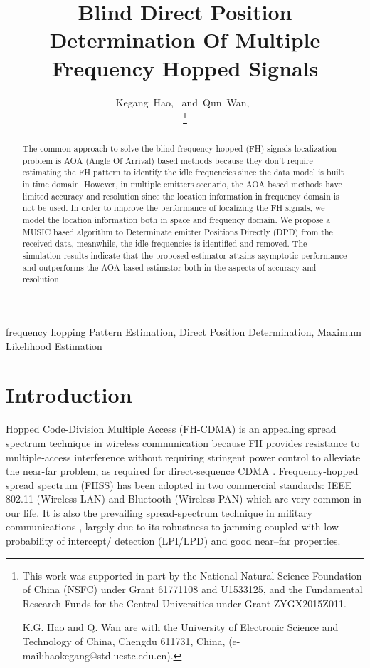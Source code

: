\documentclass[journal,10pt]{IEEEtran}
\begin{document}
\title{Blind Direct Position Determination Of Multiple Frequency Hopped Signals}

\author{Kegang~Hao,~
        and~Qun~Wan,~
        
\thanks{This work was supported in part by the National Natural Science Foundation of China (NSFC) under Grant 61771108 and U1533125, and the Fundamental Research Funds for the Central Universities under Grant ZYGX2015Z011.

    K.G. Hao and Q. Wan are with the University of Electronic Science and Technology of China, Chengdu 611731, China, (e-mail:haokegang@std.uestc.edu.cn).}
}


\maketitle

\begin{abstract}
The common approach to solve the blind frequency hopped (FH) signals localization problem is AOA (Angle Of Arrival) based methods because
they don't require estimating the FH pattern to identify the idle frequencies since the data model is built in time domain.
However, in multiple emitters scenario, the AOA based methods have limited accuracy and resolution since the location information in frequency domain is not be used.
In order to improve the performance of localizing the FH signals, we model the location information both in space and frequency domain.
We propose a MUSIC based algorithm to Determinate emitter Positions Directly (DPD) from the received data, meanwhile, the idle frequencies is identified and removed. 
The simulation results indicate that the proposed estimator attains asymptotic performance and outperforms the AOA based estimator both in the aspects of accuracy and resolution. 
\end{abstract}

\begin{IEEEkeywords}
frequency hopping Pattern Estimation, Direct Position Determination, Maximum Likelihood Estimation
\end{IEEEkeywords}


\IEEEpeerreviewmaketitle


\section{Introduction}
\label{sec:intro}

 Hopped Code-Division Multiple Access (FH-CDMA) is an appealing spread spectrum technique in wireless communication 
because FH provides resistance to multiple-access interference 
without requiring stringent power control to alleviate the near-far problem, as required for direct-sequence CDMA \cite{torrieri2000mobile}.
Frequency-hopped spread spectrum (FHSS) has been adopted in two commercial standards: IEEE 802.11 (Wireless LAN) and Bluetooth
(Wireless PAN) which are very common in our life. It is also the prevailing spread-spectrum technique in military communications \cite{torrieri1997future}, 
largely due to its robustness to jamming coupled with low probability of intercept/ detection (LPI/LPD) and good near–far properties.
\end{document}
